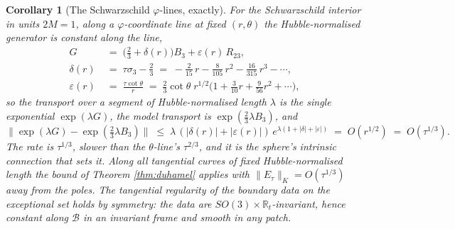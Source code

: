 \documentclass[11pt]{article}
\newtheorem{corollary}[theorem]{Corollary}
\theoremstyle{definition}
\newcommand{\R}{\mathbb{R}}
\begin{document}
\begin{corollary}[The Schwarzschild $\varphi$-lines, exactly]\label{cor:phi}
For the Schwarzschild interior in units $2M = 1$, along a $\varphi$-coordinate line at fixed $(r, \theta)$ the Hubble-normalised generator is constant along the line,
\begin{align*}
G \;&=\; \bigl(\tfrac23 + \delta(r)\bigr) B_{3} + \varepsilon(r)\, R_{23}, \\
\delta(r) \;&=\; \tau\sigma_{3} - \tfrac23 \;=\; -\tfrac{2}{15}\,r - \tfrac{8}{105}\,r^{2} - \tfrac{16}{315}\,r^{3} - \cdots, \\
\varepsilon(r) \;&=\; \frac{\tau\cot\theta}{r} \;=\; \tfrac23\cot\theta\; r^{1/2}\bigl(1 + \tfrac{3}{10} r + \tfrac{9}{56} r^{2} + \cdots\bigr),
\end{align*}
so the transport over a segment of Hubble-normalised length $\lambda$ is the single exponential $\exp(\lambda G)$, the model transport is $\exp(\tfrac23\lambda B_{3})$, and
\[
\|\exp(\lambda G) - \exp(\tfrac23\lambda B_{3})\| \;\le\; \lambda\,(|\delta(r)| + |\varepsilon(r)|)\,e^{\lambda(1 + |\delta| + |\varepsilon|)} \;=\; O(r^{1/2}) \;=\; O(\tau^{1/3}) .
\]
The rate is $\tau^{1/3}$, slower than the $\theta$-line's $\tau^{2/3}$, and it is the sphere's intrinsic connection that sets it. Along all tangential curves of fixed Hubble-normalised length the bound of Theorem \ref{thm:duhamel} applies with $\|E_{\tau}\|_{K} = O(\tau^{1/3})$ away from the poles. The tangential regularity of the boundary data on the exceptional set holds by symmetry: the data are $SO(3) \times \R_{t}$-invariant, hence constant along $\mathcal{B}$ in an invariant frame and smooth in any patch.
\end{corollary}
\end{document}
